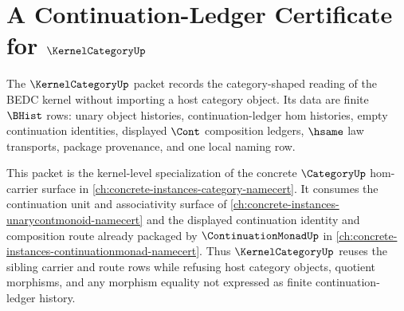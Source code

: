 \chapter{A Continuation-Ledger Certificate for $\KernelCategoryUp$}
\label{ch:concrete-instances-kernelcategory-namecert}

The $\KernelCategoryUp$ packet records the category-shaped reading of the BEDC kernel without importing a host category object. Its data are finite $\BHist$ rows: unary object histories, continuation-ledger hom histories, empty continuation identities, displayed $\Cont$ composition ledgers, $\hsame$ law transports, package provenance, and one local naming row.

This packet is the kernel-level specialization of the concrete $\CategoryUp$ hom-carrier surface in \autoref{ch:concrete-instances-category-namecert}. It consumes the continuation unit and associativity surface of \autoref{ch:concrete-instances-unarycontmonoid-namecert} and the displayed continuation identity and composition route already packaged by $\ContinuationMonadUp$ in \autoref{ch:concrete-instances-continuationmonad-namecert}. Thus $\KernelCategoryUp$ reuses the sibling carrier and route rows while refusing host category objects, quotient morphisms, and any morphism equality not expressed as finite continuation-ledger history.

